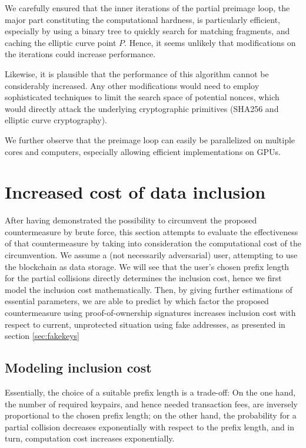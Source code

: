 \documentclass[a4paper,11pt,titlepage]{scrbook}
\begin{document}
We carefully ensured that the inner iterations of the partial preimage loop, the major part constituting the computational hardness, is particularly efficient, especially by using a binary tree to quickly search for matching fragments, and caching the elliptic curve point $P$.
Hence, it seems unlikely that modifications on the iterations could increase performance.

Likewise, it is plausible that the performance of this algorithm cannot be considerably increased.
Any other modifications would need to employ sophisticated techniques to limit the search space of potential nonces, which would directly attack the underlying cryptographic primitives (SHA256 and elliptic curve cryptography).

We further observe that the preimage loop can easily be parallelized on multiple cores and computers, especially allowing efficient implementations on GPUs.


\chapter{Increased cost of data inclusion}

After having demonstrated the possibility to circumvent the proposed countermeasure by brute force, this section attempts to evaluate the effectiveness of that countermeasure by taking into consideration the computational cost of the circumvention. 
We assume a (not necessarily adversarial) user, attempting to use the blockchain as data storage.
We will see that the user's chosen prefix length for the partial collisions directly determines the inclusion cost, hence we first model the inclusion cost mathematically. Then, by giving further estimations of essential parameters, we are able to predict by which factor the proposed countermeasure using proof-of-ownership signatures increases inclusion cost with respect to current, unprotected situation using fake addresses, as presented in section \ref{sec:fakekeys}

\section{Modeling inclusion cost}

Essentially, the choice of a suitable prefix length is a trade-off:
On the one hand, the number of required keypairs, and hence needed transaction fees, are inversely proportional to the chosen prefix length;
on the other hand, the probability for a partial collision decreases exponentially with respect to the prefix length, and in turn, computation cost increases exponentially.
\end{document}
